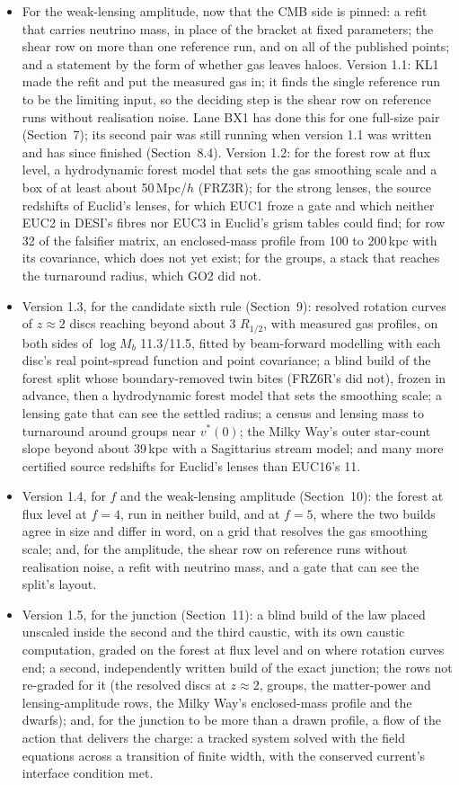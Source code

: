\documentclass[10pt]{article}
\begin{document}
\begin{itemize}
\item For the weak-lensing amplitude, now that the CMB side is pinned: a refit that carries neutrino mass, in place of the bracket at fixed parameters; the shear row on more than one reference run, and on all of the published points; and a statement by the form of whether gas leaves haloes. Version 1.1: KL1 made the refit and put the measured gas in; it finds the single reference run to be the limiting input, so the deciding step is the shear row on reference runs without realisation noise. Lane BX1 has done this for one full-size pair (Section~7); its second pair was still running when version 1.1 was written and has since finished (Section~8.4). Version 1.2: for the forest row at flux level, a hydrodynamic forest model that sets the gas smoothing scale and a box of at least about 50\,Mpc/$h$ (FRZ3R); for the strong lenses, the source redshifts of Euclid's lenses, for which EUC1 froze a gate and which neither EUC2 in DESI's fibres nor EUC3 in Euclid's grism tables could find; for row 32 of the falsifier matrix, an enclosed-mass profile from 100 to 200\,kpc with its covariance, which does not yet exist; for the groups, a stack that reaches the turnaround radius, which GO2 did not.
\item Version 1.3, for the candidate sixth rule (Section~9): resolved rotation curves of $z\approx2$ discs reaching beyond about 3 $R_{1/2}$, with measured gas profiles, on both sides of $\log M_b$ 11.3/11.5, fitted by beam-forward modelling with each disc's real point-spread function and point covariance; a blind build of the forest split whose boundary-removed twin bites (FRZ6R's did not), frozen in advance, then a hydrodynamic forest model that sets the smoothing scale; a lensing gate that can see the settled radius; a census and lensing mass to turnaround around groups near $v^*(0)$; the Milky Way's outer star-count slope beyond about 39\,kpc with a Sagittarius stream model; and many more certified source redshifts for Euclid's lenses than EUC16's 11.
\item Version 1.4, for $f$ and the weak-lensing amplitude (Section~10): the forest at flux level at $f=4$, run in neither build, and at $f=5$, where the two builds agree in size and differ in word, on a grid that resolves the gas smoothing scale; and, for the amplitude, the shear row on reference runs without realisation noise, a refit with neutrino mass, and a gate that can see the split's layout.
\item Version 1.5, for the junction (Section~11): a blind build of the law placed unscaled inside the second and the third caustic, with its own caustic computation, graded on the forest at flux level and on where rotation curves end; a second, independently written build of the exact junction; the rows not re-graded for it (the resolved discs at $z\approx2$, groups, the matter-power and lensing-amplitude rows, the Milky Way's enclosed-mass profile and the dwarfs); and, for the junction to be more than a drawn profile, a flow of the action that delivers the charge: a tracked system solved with the field equations across a transition of finite width, with the conserved current's interface condition met.

\end{itemize}
\end{document}
